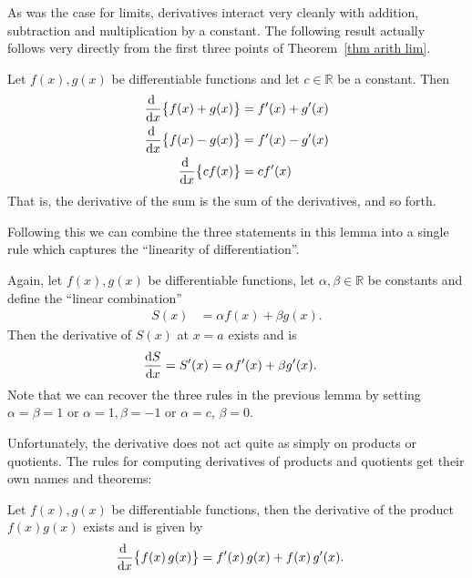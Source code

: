 As was the case for limits, derivatives interact very cleanly with addition, subtraction
and multiplication by a constant. The following result actually follows very directly
from the first three points of Theorem~\ref{thm arith lim}.
\begin{lemma}\label{thm:DIFFaddsub}
Let $f(x),g(x)$ be differentiable functions and let $c \in \mathbb{R}$ be a constant.
Then
\begin{align*}
  \diff{}{x} \big\{ f(x)+g(x) \big\} &= f'(x)+g'(x)\\
  \diff{}{x} \big\{ f(x)-g(x)\big\} &= f'(x)-g'(x)\\
  \diff{}{x} \big\{ c f(x) \big\} &= c f'(x)
\end{align*}
That is,  the derivative of the sum is the sum of the derivatives, and so forth.
\end{lemma}
Following this we can combine the three statements in this lemma into a single rule which
captures the ``linearity of differentiation''.
\begin{theorem}\label{thm:DIFFlinearity}
Again, let $f(x),g(x)$ be differentiable functions, let $\alpha, \beta \in \mathbb{R}$
be constants and define the  ``linear combination''
\begin{align*}
  S(x) &= \alpha f(x) + \beta g(x).
\end{align*}
Then the derivative of $S(x)$ at $x=a$ exists and is
\begin{align*}
  \diff{S}{x} = S'(x) &= \alpha f'(x) + \beta g'(x).
\end{align*}
Note that we can recover the three rules in the previous lemma by setting
$\alpha=\beta=1$ or $\alpha=1, \beta=-1$ or $\alpha=c$, $\beta=0$.
\end{theorem}


Unfortunately, the derivative does not act quite as simply on
products or quotients. The rules for computing derivatives of products and
quotients get their own names and theorems:

\begin{theorem}\label{thm:DIFFprodRule}
Let $f(x),g(x)$ be differentiable functions, then the derivative of the product
$f(x)g(x)$ exists and is given by
\begin{align*}
  \diff{}{x} \big\{ f(x) \, g(x) \big\} &= f'(x) \, g(x) + f(x) \, g'(x).
\end{align*}
\end{theorem}

